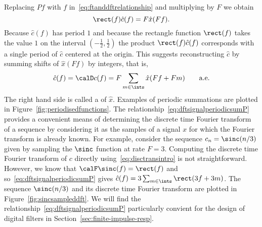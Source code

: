 Replacing $Pf$ with $f$ in~\eqref{eq:ftanddftrelationship} and multiplying by $F$ we obtain
\[
\rect(f) \hat{c}(f) = F \hat{x}(Ff).
\]
Because $\hat{c}(f)$ has period $1$ and because the rectangle function $\rect(f)$ takes the value $1$ on the interval $(-\tfrac{1}{2}, \tfrac{1}{2})$ the product $\rect(f)\hat{c}(f)$ corresponds with a single period of $\hat{c}$ centered at the origin.  This suggests reconstructing $\hat{c}$ by summing shifts of $\hat{x}(Ff)$ by integers, that is,
\begin{equation}\label{eq:dftsignalperiodicsumP}
\hat{c}(f) = \calD c(f) = F \sum_{m \in \ints} \hat{x}(Ff + Fm) \qquad \text{a.e.}
\end{equation}
The right hand side is called a  of $\hat{x}$.  Examples of periodic summations are plotted in Figure~\ref{fig:periodisedfunctions}.  The relationship~\eqref{eq:dftsignalperiodicsumP} provides a convenient means of determining the discrete time Fourier transform of a sequence by considering it as the samples of a signal $x$ for which the Fourier transform is already known.  For example, consider the sequence $c_n = \sinc(n/3)$ given by sampling the $\sinc$ function at rate $F = 3$.  Computing the discrete time Fourier transform of $c$ directly using~\eqref{eq:disctransintro} is not straightforward.  However, we know that $\calF\sinc(f) = \rect(f)$ and so~\eqref{eq:dftsignalperiodicsumP} gives $\hat{c}(f) = 3 \sum_{m \in \ints} \rect(3f + 3m)$.  The sequence $\sinc(n/3)$ and its discrete time Fourier transform are plotted in Figure~\ref{fig:sincsampleddft}.  We will find the relationship~\eqref{eq:dftsignalperiodicsumP} particularly convient for the design of digital filters in Section~\ref{sec:finite-impulse-resp}. 

